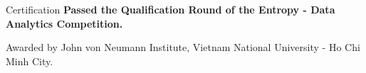 \begin{rubric}{Certification}
%
\entry*[2017]%
	\textbf{Passed the Qualification Round of the Entropy - Data Analytics Competition.}\par
    Awarded by John von Neumann Institute, Vietnam National University - Ho Chi Minh City.
%
\end{rubric}